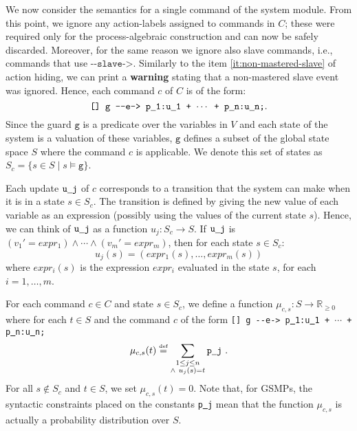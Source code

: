 \documentclass{article}
\newcommand{\eqdef}{\ensuremath{\stackrel{\text{\tiny def}}{=}}}
\newcommand{\arci}[1]{{-}{-}{#1}->}
\newcommand{\Rsetpo}{\mathbb{R}_{\ge 0}}
\newcommand{\calE}{\mathcal{E}}
\renewcommand{\_}{\underline{~}}
\newcommand{\events}{{\calE}}
\newcommand{\suc}{Succ}
\newcommand{\code}[1]{\texttt{#1}}
\begin{document}
We now consider the semantics for a single command of the system module. 
From this point, we ignore any action-labels assigned to commands in $C$; these were required only for the process-algebraic construction and can now be safely discarded.
Moreover, for the same reason we ignore also slave commands, i.e., commands that use $\code{\arci{slave}}$. Similarly to the item \ref{it:non-mastered-slave} of action hiding, we can print a \textbf{warning} stating that a non-mastered slave event was ignored.
Hence, each command $c$ of $C$ is of the form:
$$\code{[] g \arci{e} p\_1:u\_1 + $\cdots$ + p\_n:u\_n;}.$$
%
Since the guard $\code{g}$ is a predicate over the variables in $V$ and each state of the system is a valuation of these variables, $\code{g}$ defines a subset of the global state space $S$ where the command $c$ is applicable. 
We denote this set of states as $S_c = \{s \in S \mid s \models \code{g}\}$.

Each update $\code{u\_j}$ of $c$ corresponds to a transition that the system can make when it is in a state $s \in S_c$. 
The transition is defined by giving the new value of each variable as an expression (possibly using the values of the current state $s$).
Hence, we can think of $\code{u\_j}$ as a function $u_j\colon S_c \to S$.
If $\code{u\_j}$ is $(v_1' = expr_1)\wedge \cdots \wedge (v_m'
= expr_m)$, then for each state $s \in S_c$:
$$
u_j(s) = (expr_1(s), \ldots, expr_m(s))
$$
where $expr_i(s)$ is the expression $expr_i$ evaluated in the state $s$, for each $i=1,\dots,m$.
%

For each command $c \in C$ and state $s \in S_c$, we define a function $\mu_{c,s} \colon S \to \mathbb{R}_{\geq0}$ where for each $t\in S$ and the command $c$ of the form \code{[] g \arci{e} p\_1:u\_1 + $\cdots$ + p\_n:u\_n;}
\[ \mu_{c,s}(t) \eqdef \sum_{\substack{
		1 \leq j \leq n \\
		\wedge~ u_j(s) = t }}             \code{p\_j} ~.
\]
For all $s\not\in S_c$ and $t \in S$, we set $\mu_{c,s}(t)=0$.
Note that, for GSMPs, the syntactic constraints placed on the constants 
\code{p\_j} mean that the function $\mu_{c,s}$ is actually a probability distribution over $S$.

\end{document}
